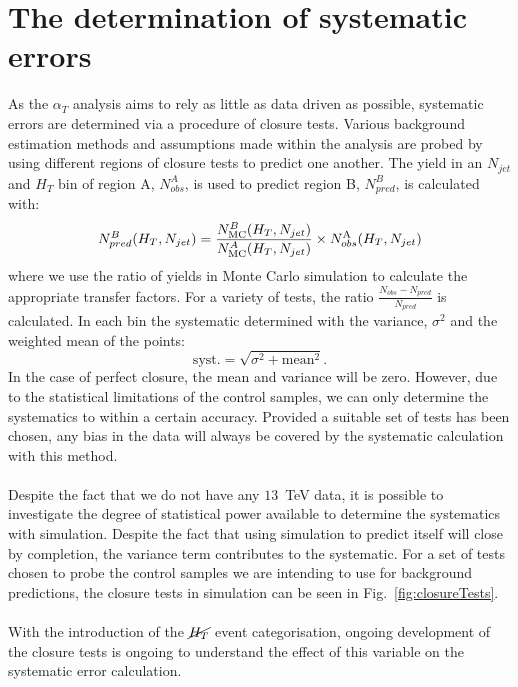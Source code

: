 
\section{The determination of systematic errors}
\label{sec:closureTests}

As the $\alpha_T$ analysis aims to rely as little as data driven as possible, systematic errors are determined via a procedure of closure tests. Various background estimation methods and assumptions made within the analysis are probed by using different regions of closure tests to predict one another. The yield in an $N_{jet}$ and $H_T$ bin of region A, $N_{obs}^A$, is used to predict region B, $N_{pred}^B$, is calculated with:
\begin{equation}
  N_{pred}^B(H_T,N_{jet}) = \frac{N_{\rm MC}^
      B(H_T,N_{jet})}{N_{\rm MC}^A(H_T,N_{jet})} \times 
      N_{obs}^{\rm A}(H_T,N_{jet})   
\end{equation}
where we use the ratio of yields in Monte Carlo simulation to calculate the appropriate transfer factors. For a variety of tests, the ratio $\frac{N_{obs}-N_{pred}}{N_{pred}}$ is calculated. In each bin the systematic determined with the variance, $\sigma^2$ and the weighted mean of the points: 
\begin{equation}
\textrm{syst.} = \sqrt{\sigma^2+\textrm{mean}^2}.
\end{equation}
In the case of perfect closure, the mean and variance will be zero. However, due to the statistical limitations of the control samples, we can only determine the systematics to within a certain accuracy. Provided a suitable set of tests has been chosen, any bias in the data will always be covered by the systematic calculation with this method.
\\\\
Despite the fact that we do not have any $13$~TeV data, it is possible to investigate the degree of statistical power available to determine the systematics with simulation. Despite the fact that using simulation to predict itself will close by completion, the variance term contributes to the systematic. For a set of tests chosen to probe the control samples we are intending to use for background predictions, the closure tests in simulation can be seen in Fig.~\ref{fig:closureTests}.
\\\\
With the introduction of the $\cancel{H_T}$ event categorisation, ongoing development of the closure tests is ongoing to understand the effect of this variable on the systematic error calculation.

